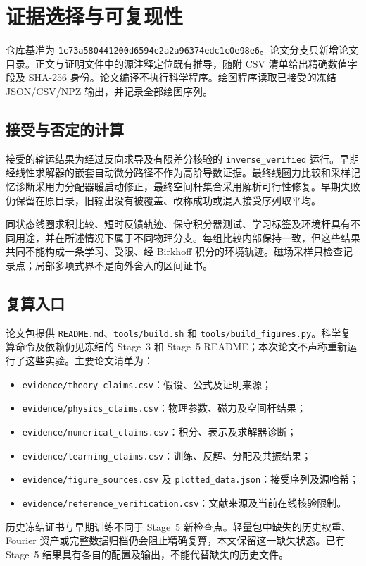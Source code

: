 \section{证据选择与可复现性}
仓库基准为 \texttt{1c73a580441200d6594e2a2a96374edc1c0e98e6}。论文分支只新增论文目录。正文与证明文件中的源注释定位既有推导，随附 CSV 清单给出精确数值字段及 SHA-256 身份。论文编译不执行科学程序。绘图程序读取已接受的冻结 JSON/CSV/NPZ 输出，并记录全部绘图序列。

\subsection{接受与否定的计算}
接受的输运结果为经过反向求导及有限差分核验的 \texttt{inverse\_verified} 运行。早期经线性求解器的嵌套自动微分路径不作为高阶导数证据。最终线圈力比较和采样记忆诊断采用力分配器暖启动修正，最终空间杆集合采用解析可行性修复。早期失败仍保留在原目录，旧输出没有被覆盖、改称成功或混入接受序列取平均。

同状态线圈求积比较、短时反馈轨迹、保守积分器测试、学习标签及环境杆具有不同用途，并在所述情况下属于不同物理分支。每组比较内部保持一致，但这些结果共同不能构成一条学习、受限、经 Birkhoff 积分的环境轨迹。磁场采样只检查记录点；局部多项式界不是向外舍入的区间证书。

\subsection{复算入口}
论文包提供 \texttt{README.md}、\texttt{tools/build.sh} 和 \texttt{tools/build\_figures.py}。科学复算命令及依赖仍见冻结的 Stage~3 和 Stage~5 README；本次论文不声称重新运行了这些实验。主要论文清单为：
\begin{itemize}
\item \texttt{evidence/theory\_claims.csv}：假设、公式及证明来源；
\item \texttt{evidence/physics\_claims.csv}：物理参数、磁力及空间杆结果；
\item \texttt{evidence/numerical\_claims.csv}：积分、表示及求解器诊断；
\item \texttt{evidence/learning\_claims.csv}：训练、反解、分配及共振结果；
\item \texttt{evidence/figure\_sources.csv} 及 \texttt{plotted\_data.json}：接受序列及源哈希；
\item \texttt{evidence/reference\_verification.csv}：文献来源及当前在线核验限制。
\end{itemize}

历史冻结证书与早期训练不同于 Stage~5 新检查点。轻量包中缺失的历史权重、Fourier 资产或完整数据归档仍会阻止精确复算，本文保留这一缺失状态。已有 Stage~5 结果具有各自的配置及输出，不能代替缺失的历史文件。
